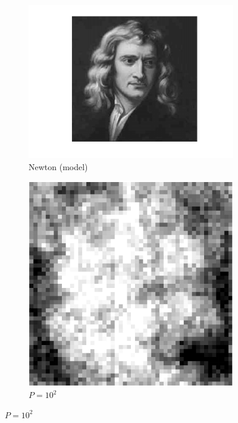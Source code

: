 \documentclass[english,11pt]{article}
\numberwithin{equation}{section}
\theoremstyle{plain}
\theoremstyle{definition}
\theoremstyle{remark}
\theoremstyle{plain}
\theoremstyle{remark}
\theoremstyle{plain}
\theoremstyle{plain}
\begin{document}
\begin{figure}[h!]
	\centering
	\begin{subfigure}[h]{0.25\textwidth}
		\centering
		\includegraphics[scale=0.4]{Newton}
		\caption{Newton  (model)}
	\end{subfigure}%
	\begin{subfigure}[h]{0.25\textwidth}
		\centering
		\includegraphics[scale=0.4]{Einstein_100}
		\caption{$P =10^2$}
	\end{subfigure}%

\end{figure}
\end{document}
